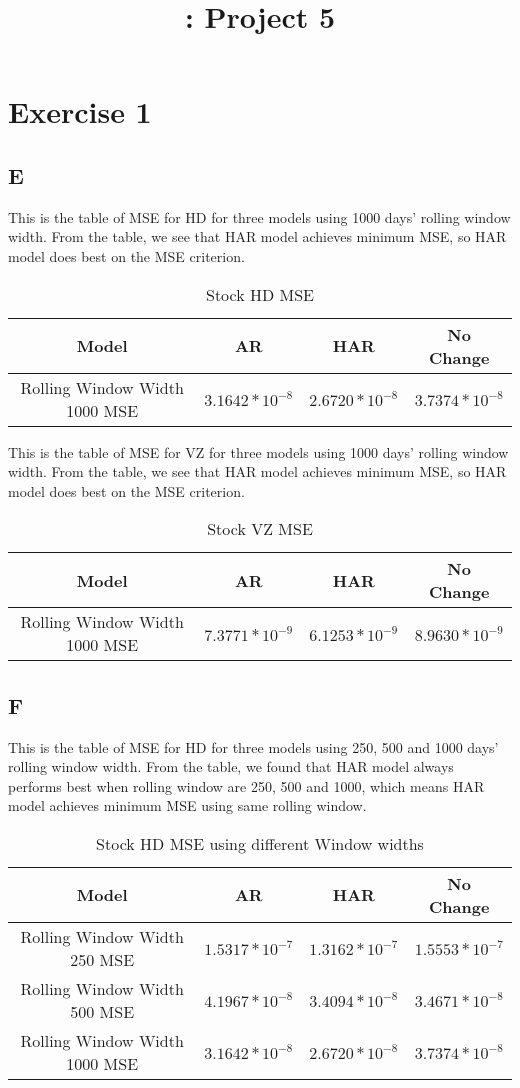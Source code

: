 \documentclass{report}
\title{\LectureTitle: Project 5}
\begin{document}
\maketitle
\newpage

\section{ Exercise 1}

\subsection{E}
This is the table of MSE for HD for three models using 1000 days' rolling window width. From the table, we see that HAR model achieves minimum MSE, so HAR model does best on the MSE criterion.

\begin{table}[H]
\centering
\begin{tabular}{|c|c|c|c|}
\hline
Model&AR&HAR&No Change\\
\hline
Rolling Window Width 1000 MSE& $3.1642*10^{-8}$ & $2.6720*10^{-8}$ & $3.7374*10^{-8}$\\
\hline
\end{tabular}
\caption{ Stock HD MSE}
\end{table}

This is the table of MSE for VZ for three models using 1000 days' rolling window width. From the table, we see that HAR model achieves minimum MSE, so HAR model does best on the MSE criterion.

\begin{table}[H]
\centering
\begin{tabular}{|c|c|c|c|}
\hline
Model&AR&HAR&No Change\\
\hline
Rolling Window Width 1000 MSE& $7.3771*10^{-9}$ & $6.1253*10^{-9}$ & $8.9630*10^{-9}$\\
\hline
\end{tabular}
\caption{ Stock VZ MSE}
\end{table}
\subsection{F}
This is the table of MSE for HD for three models using 250, 500 and 1000 days' rolling window width. From the table, we found that HAR model always performs best when rolling window are 250, 500 and 1000, which means HAR model achieves minimum MSE using same rolling window.

\begin{table}[H]
\centering
\begin{tabular}{|c|c|c|c|}
\hline
Model&AR&HAR&No Change\\
\hline
Rolling Window Width 250 MSE& $1.5317*10^{-7}$ & $1.3162*10^{-7}$ & $1.5553*10^{-7}$\\
\hline
Rolling Window Width 500 MSE& $4.1967*10^{-8}$ & $3.4094*10^{-8}$ & $3.4671*10^{-8}$\\
\hline
Rolling Window Width 1000 MSE& $3.1642*10^{-8}$ & $2.6720*10^{-8}$ & $3.7374*10^{-8}$\\
\hline
\end{tabular}
\caption{ Stock HD MSE using different Window widths}
\end{table}
\end{document}
